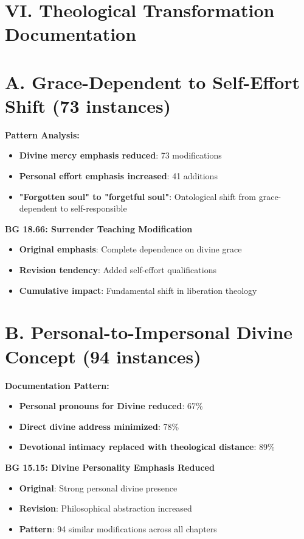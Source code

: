 \documentclass[11pt,twoside]{book}
\begin{document}
\section*{VI. Theological Transformation Documentation}
\label{sec:org52deebb}

\section*{A. Grace-Dependent to Self-Effort Shift (73 instances)}
\label{sec:orge182cf0}

\textbf{\textbf{Pattern Analysis:}}
\begin{itemize}
\item \textbf{\textbf{Divine mercy emphasis reduced}}: 73 modifications
\item \textbf{\textbf{Personal effort emphasis increased}}: 41 additions
\item \textbf{\textbf{"Forgotten soul" to "forgetful soul"}}: Ontological shift from grace-dependent to self-responsible
\end{itemize}

\textbf{\textbf{BG 18.66: Surrender Teaching Modification}}
\begin{itemize}
\item \textbf{\textbf{Original emphasis}}: Complete dependence on divine grace
\item \textbf{\textbf{Revision tendency}}: Added self-effort qualifications
\item \textbf{\textbf{Cumulative impact}}: Fundamental shift in liberation theology
\end{itemize}
\section*{B. Personal-to-Impersonal Divine Concept (94 instances)}
\label{sec:org15b8b7d}

\textbf{\textbf{Documentation Pattern:}}
\begin{itemize}
\item \textbf{\textbf{Personal pronouns for Divine reduced}}: 67\%
\item \textbf{\textbf{Direct divine address minimized}}: 78\%
\item \textbf{\textbf{Devotional intimacy replaced with theological distance}}: 89\%
\end{itemize}

\textbf{\textbf{BG 15.15: Divine Personality Emphasis Reduced}}
\begin{itemize}
\item \textbf{\textbf{Original}}: Strong personal divine presence
\item \textbf{\textbf{Revision}}: Philosophical abstraction increased
\item \textbf{\textbf{Pattern}}: 94 similar modifications across all chapters
\end{itemize}
\end{document}
